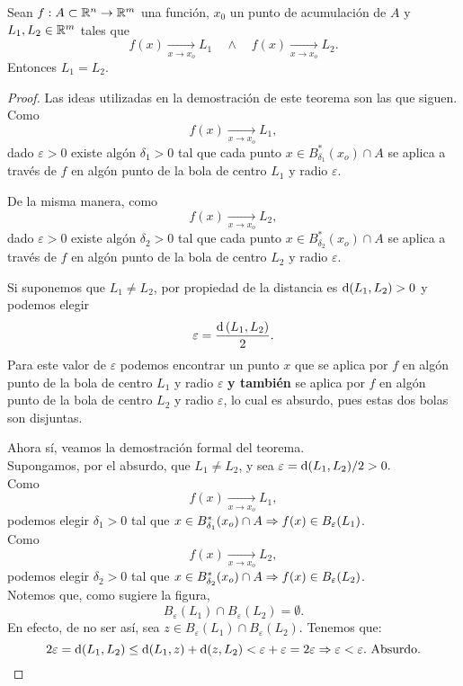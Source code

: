 \begin{theorem} \label{teo:unicidad_limite}
\mbox{}

Sean $f:A \subset \mathbb{R}^n \to \mathbb{R}^m$ una funci\'on, $x_0$ un punto de acumulaci\'on de $A$ y $L_1, L_2 \in \mathbb{R}^m$ tales que 
\[
 f(x) \xrightarrow[x \to x_o]{} L_1 \quad \wedge \quad f(x) \xrightarrow[x \to x_o]{} L_2.
\]
Entonces $L_1 = L_2$.
\begin{proof}
\mbox{}

Las ideas utilizadas en la demostraci\'on de este teorema son las que siguen.\\
Como 
\[
 f(x) \xrightarrow[x \to x_o]{} L_1,
\]
dado $\varepsilon > 0$ existe alg\'on $\delta_1 > 0$ tal que cada punto $x \in B_{\delta_1}^*(x_o) \cap A$ se aplica a trav\'es de $f$ en alg\'on punto de la bola de centro $L_1$ y radio $\varepsilon$.

\def\Ro{2.0}
\def\Rb{1.0}
\def\Ra{3.0}
\def\sep{1.0*\Ro}




De la misma manera, como 
\[
 f(x) \xrightarrow[x \to x_o]{} L_2,
\]
dado $\varepsilon > 0$ existe alg\'on $\delta_2 > 0$ tal que cada punto $x \in B_{\delta_2}^*(x_o) \cap A$ se aplica a trav\'es de $f$ en alg\'on punto de la bola de centro $L_2$ y radio $\varepsilon$.



Si suponemos que $L_1 \ne L_2$, por propiedad de la distancia es $\operatorname{d}(L_1,L_2) > 0$ y podemos elegir 
\[
 \varepsilon = \frac{\operatorname{d}{(L_1,L_2)}}{2}.
\]
Para este valor de $\varepsilon$ podemos encontrar un punto $x$ que se aplica por $f$ en alg\'on punto de la bola de centro $L_1$ y radio $\varepsilon$ \textbf{y tambi\'en} se aplica por $f$ en alg\'on punto de la bola de centro $L_2$ y radio $\varepsilon$, lo cual es absurdo, pues estas dos bolas son disjuntas.



Ahora s\'i, veamos la demostraci\'on formal del teorema.\\
 Supongamos, por el absurdo, que $L_1 \ne L_2$, y sea $\varepsilon = \operatorname{d}(L_1,L_2)/2 > 0.$ \\ 
 Como 
 \[
  f(x) \xrightarrow[x \to x_o]{} L_1,
 \]
podemos elegir $\delta_1 > 0$ tal que $x \in B_{\delta_1}^*(x_o) \cap A \Rightarrow f(x) \in B_{\varepsilon}(L_1)$.\\
Como 
\[
 f(x) \xrightarrow[x \to x_o]{} L_2,
\]
 podemos elegir $\delta_2 > 0$ tal que $x \in B_{\delta_2}^*(x_o) \cap A \Rightarrow f(x) \in B_{\varepsilon}(L_2)$.\\
 Notemos que, como sugiere la figura, 
 \[
  B_{\varepsilon}(L_1) \cap B_{\varepsilon}(L_2) = \emptyset.
 \]
 En efecto, de no ser as\'i, sea $z \in B_{\varepsilon}(L_1) \cap B_{\varepsilon}(L_2)$. Tenemos que:
 \[
  2 \varepsilon = \operatorname{d}(L_1,L_2) \le \operatorname{d}(L_1,z) + \operatorname{d}(z,L_2)
  < \varepsilon + \varepsilon = 2 \varepsilon \Rightarrow \varepsilon < \varepsilon. \text{ Absurdo.}
 \]


\end{proof}
\end{theorem}

